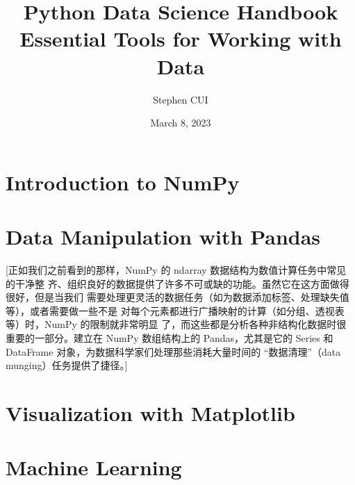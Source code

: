 \documentclass[openany]{book}
\title{\textbf{Python Data Science Handbook}\\Essential Tools for Working with Data}
\author{Stephen CUI\orcidlink{0009-0008-2664-5882}}
\date{March 8, 2023}
\begin{document}
\frontmatter
\maketitle
\tableofcontents
\mainmatter
\part{Introduction to NumPy}









\part{Data Manipulation with Pandas}
[正如我们之前看到的那样，NumPy 的 ndarray 数据结构为数值计算任务中常见的干净整
    齐、组织良好的数据提供了许多不可或缺的功能。虽然它在这方面做得很好，但是当我们
    需要处理更灵活的数据任务（如为数据添加标签、处理缺失值等），或者需要做一些不是
    对每个元素都进行广播映射的计算（如分组、透视表等）时，NumPy 的限制就非常明显
    了，而这些都是分析各种非结构化数据时很重要的一部分。建立在 NumPy 数组结构上的
    Pandas，尤其是它的 Series 和 DataFrame 对象，为数据科学家们处理那些消耗大量时间的
    “数据清理”（data munging）任务提供了捷径。]













\part{Visualization with Matplotlib}












\part{Machine Learning}












\end{document}
